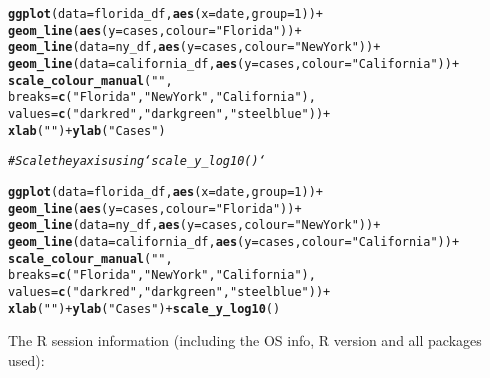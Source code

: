 \documentclass{article}\usepackage[]{graphicx}\usepackage[]{xcolor}
\makeatletter
\newcommand{\hlstr}[1]{\textcolor[rgb]{0.192,0.494,0.8}{#1}}%
\newcommand{\hlcom}[1]{\textcolor[rgb]{0.678,0.584,0.686}{\textit{#1}}}%
\newcommand{\hlkwd}[1]{\textcolor[rgb]{0.737,0.353,0.396}{\textbf{#1}}}%
\newenvironment{kframe}{%
 \def\at@end@of@kframe{}%
 \ifinner\ifhmode%
  \def\at@end@of@kframe{\end{minipage}}%
  \begin{minipage}{\columnwidth}%
 \fi\fi%
 \def\FrameCommand##1{\hskip\@totalleftmargin \hskip-\fboxsep
 \colorbox{shadecolor}{##1}\hskip-\fboxsep
     \hskip-\linewidth \hskip-\@totalleftmargin \hskip\columnwidth}%
 \MakeFramed {\advance\hsize-\width
   \@totalleftmargin\z@ \linewidth\hsize
   \@setminipage}}%
 {\par\unskip\endMakeFramed%
 \at@end@of@kframe}
\newenvironment{knitrout}{}{} %
\makeatother
\begin{document}
\begin{knitrout}
\begin{kframe}
\begin{alltt}
\hlkwd{ggplot}(data=florida_df, \hlkwd{aes}(x=date, group=1)) +
  \hlkwd{geom_line}(\hlkwd{aes}(y = cases, colour = \hlstr{"Florida"})) +
  \hlkwd{geom_line}(data=ny_df, \hlkwd{aes}(y = cases,colour=\hlstr{"New York"})) +
  \hlkwd{geom_line}(data=california_df, \hlkwd{aes}(y = cases, colour=\hlstr{"California"})) +
  \hlkwd{scale_colour_manual}(\hlstr{""},
                      breaks = \hlkwd{c}(\hlstr{"Florida"}, \hlstr{"New York"}, \hlstr{"California"}),
                      values = \hlkwd{c}(\hlstr{"darkred"}, \hlstr{"darkgreen"}, \hlstr{"steelblue"})) +
  \hlkwd{xlab}(\hlstr{" "}) + \hlkwd{ylab}(\hlstr{"Cases"})


\hlcom{# Scale the y axis using `scale_y_log10()`}

\hlkwd{ggplot}(data=florida_df, \hlkwd{aes}(x=date, group=1)) +
  \hlkwd{geom_line}(\hlkwd{aes}(y = cases, colour = \hlstr{"Florida"})) +
  \hlkwd{geom_line}(data=ny_df, \hlkwd{aes}(y = cases,colour=\hlstr{"New York"})) +
  \hlkwd{geom_line}(data=california_df, \hlkwd{aes}(y = cases, colour=\hlstr{"California"})) +
  \hlkwd{scale_colour_manual}(\hlstr{""},
                      breaks = \hlkwd{c}(\hlstr{"Florida"}, \hlstr{"New York"}, \hlstr{"California"}),
                      values = \hlkwd{c}(\hlstr{"darkred"}, \hlstr{"darkgreen"}, \hlstr{"steelblue"})) +
  \hlkwd{xlab}(\hlstr{" "}) + \hlkwd{ylab}(\hlstr{"Cases"}) + \hlkwd{scale_y_log10}()
\end{alltt}


{\ttfamily\noindent\bfseries{}}\end{kframe}
\end{knitrout}

The R session information (including the OS info, R version and all
packages used):
\end{document}
